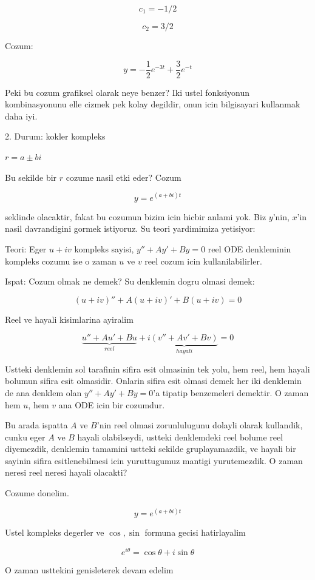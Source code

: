 \documentclass[12pt,fleqn]{article}\usepackage{../common}
\begin{document}
\[ c_1 = -1/2 \]

\[ c_2 = 3/2 \]

Cozum: 

\[ y = -\frac{1}{2}e^{-3t} + \frac{3}{2}e^{-t} \]

Peki bu cozum grafiksel olarak neye benzer? Iki ustel fonksiyonun
kombinasyonunu elle cizmek pek kolay degildir, onun icin bilgisayari
kullanmak daha iyi. 

2. Durum: kokler kompleks 

$r = a \pm bi$

Bu sekilde bir $r$ cozume nasil etki eder? Cozum

\[ y = e^{(a+bi)t} \] 

seklinde olacaktir, fakat bu cozumun bizim icin hicbir anlami yok. Biz
$y$'nin, $x$'in nasil davrandigini gormek istiyoruz. Su teori yardimimiza
yetisiyor: 

Teori: Eger $u + iv$ kompleks sayisi, $y'' + Ay' + By = 0$ reel ODE
denkleminin kompleks cozumu ise o zaman $u$ ve $v$ reel cozum icin
kullanilabilirler.

Ispat: Cozum olmak ne demek? Su denklemin dogru olmasi demek: 

\[ (u+iv)'' + A(u+iv)' + B(u+iv) = 0\]

Reel ve hayali kisimlarina ayiralim

\[ 
\underbrace{u'' + Au' + Bu}_{reel} + 
i\underbrace{(v'' + Av' + Bv)}_{hayali} = 0
\]

Ustteki denklemin sol tarafinin sifira esit olmasinin tek yolu, hem reel,
hem hayali bolumun sifira esit olmasidir. Onlarin sifira esit olmasi demek
her iki denklemin de ana denklem olan $y'' + Ay' + By = 0$'a tipatip
benzemeleri demektir. O zaman hem $u$, hem $v$ ana ODE icin bir cozumdur. 

Bu arada ispatta $A$ ve $B$'nin reel olmasi zorunlulugunu dolayli olarak
kullandik, cunku eger $A$ ve $B$ hayali olabilseydi, ustteki denklemdeki
reel bolume reel diyemezdik, denklemin tamamini ustteki sekilde
gruplayamazdik, ve hayali bir sayinin sifira esitlenebilmesi icin
yuruttugumuz mantigi yurutemezdik. O zaman neresi reel neresi hayali
olacakti? 

Cozume donelim. 

\[ y = e^{(a+bi)t} \] 

Ustel kompleks degerler ve $\cos, \sin$ formuna gecisi hatirlayalim

\[ e^{i\theta} = \cos \theta + i\sin \theta \]

O zaman usttekini genisleterek devam edelim
\end{document}
